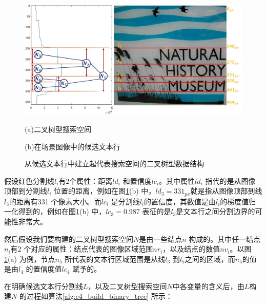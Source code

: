     \begin{figure}[!h]
    \centering
    \includegraphics[width=\textwidth]{./figures/c4_binary_tree_construction.jpg}
    \begin{minipage}[t]{0.40\linewidth}
    \centerline{\small (a)二叉树型搜索空间}
    \end{minipage}
    \begin{minipage}[t]{0.51\linewidth}
    \centerline{\small(b)在场景图像中的候选文本行}
    \end{minipage}
    \caption{从候选文本行中建立起代表搜索空间的二叉树型数据结构}
    \label{fig.c4_binary_tree_construction}
    \end{figure}

    假设红色分割线$l_i$有2个属性：距离$ld_i$ 和置信度$lc_i$。其中属性$ld_i$ 指代的是从图像顶部到分割线$l_i$ 位置的距离，例如在图\ref{fig.c4_binary_tree_construction}(b) 中，$ld_3=331_{px}$就是指从图像顶部到线$l_3$的距离有331 个像素大小。而$lc_i$ 是分割线$l_i$的置信度，其数值是由$l_i$的梯度值归一化得到的，例如在图\ref{fig.c4_binary_tree_construction}(b) 中，$lc_3=0.987$ 表征的是$l_3$是文本行之间分割边界的可能性非常大。

    然后假设我们要构建的二叉树型搜索空间$N$是由一些结点$n$ 构成的。其中任一结点$n_i$有2 个对应的属性：结点代表的图像区域范围$nr_i$，以及结点的数值$nv_i$。以图\ref{fig.c4_binary_tree_construction}(a) 为例，节点$n_5$ 所代表的文本行区域范围是从线$l_3$ 到$l_5$之间的区域，而$n_5$的值是由$l_4$ 的置信度值$lc_4$ 赋予的。

    在明确候选文本行分割线$L$，以及二叉树型搜索空间$N$中各变量的含义后，由$L$构建$N$ 的过程如算法\ref{alg:c4_build_binary_tree} 所示：


